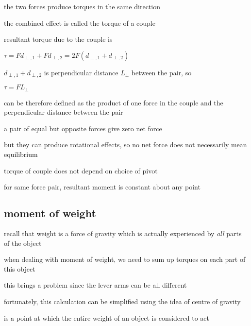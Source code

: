 the two forces produce torques in the same direction

the combined effect is called the torque of a couple



resultant torque due to the couple is

{
	\centering
	
	$ \tau = Fd_{\perp,1} + Fd_{\perp,2} = 2F(d_{\perp,1} + d_{\perp,2}) $
	
}

$d_{\perp,1} + d_{\perp,2}$ is perpendicular distance $L_\perp$ between the pair, so

{
	\centering
	
	$ \boxed{\tau = F L_\perp} $
	
}

\begin{ilight}
	 can be therefore defined as the product of one force in the couple and the perpendicular distance between the pair
\end{ilight}

\cmt a pair of equal but opposite forces give zero net force

but they can produce rotational effects, so no net force does not necessarily mean equilibrium

\cmt torque of couple does not depend on choice of pivot

for same force pair, resultant moment is constant about any point



\subsection{moment of weight}

recall that weight is a force of gravity which is actually experienced by \emph{all} parts of the object

when dealing with moment of weight, we need to sum up torques on each part of this object

this brings a problem since the lever arms can be all different

fortunately, this calculation can be simplified using the idea of centre of gravity

\begin{ilight}
	 is a point at which the entire weight of an object is considered to act
\end{ilight}




